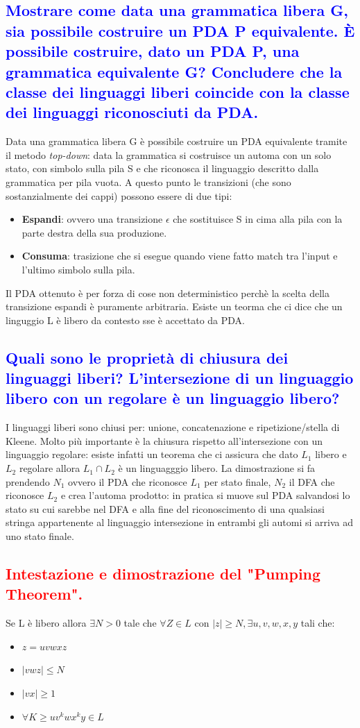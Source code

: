 \documentclass{article}
\begin{document}
\subsection{\textcolor{blue}{Mostrare come data una grammatica libera G, sia possibile costruire un PDA P equivalente.
        È possibile costruire, dato un PDA P, una grammatica equivalente G?
        Concludere che la classe dei linguaggi liberi coincide con la classe dei linguaggi riconosciuti da PDA.}}
Data una grammatica libera G è possibile costruire un PDA equivalente tramite il metodo \textit{top-down}: data la grammatica si costruisce un automa con un solo stato, con simbolo sulla pila S e che riconosca
il linguaggio descritto dalla grammatica per pila vuota. A questo punto le transizioni (che sono sostanzialmente dei cappi) possono essere di due tipi:
\begin{itemize}
    \item \textbf{Espandi}: ovvero una transizione $\epsilon$ che sostituisce S in cima alla pila con la parte destra della sua produzione.
    \item \textbf{Consuma}: trasizione che si esegue quando viene fatto match tra l'input e l'ultimo simbolo sulla pila.
\end{itemize}
Il PDA ottenuto è per forza di cose non deterministico perchè la scelta della transizione espandi è puramente arbitraria.
Esiste un teorma che ci dice che un linguggio L è libero da contesto sse è accettato da PDA.

\subsection{\textcolor{blue}{Quali sono le proprietà di chiusura dei linguaggi liberi? L'intersezione di un linguaggio libero con un regolare è un linguaggio libero?}}
I linguaggi liberi sono chiusi per: unione, concatenazione e ripetizione/stella di Kleene. Molto più importante è la chiusura rispetto all'intersezione con un linguaggio regolare: esiste infatti un
teorema che ci assicura che dato $L_1$ libero e $L_2$ regolare allora $L_1 \cap L_2$ è un linguagggio libero.
La dimostrazione si fa prendendo $N_1$ ovvero il PDA che riconosce $L_1$ per stato finale, $N_2$ il DFA che riconosce $L_2$ e crea l'automa prodotto: in pratica si muove sul PDA salvandosi lo stato su cui
sarebbe nel DFA e alla fine del riconoscimento di una qualsiasi stringa appartenente al linguaggio intersezione in entrambi gli automi si arriva ad uno stato finale.

\subsection{\textcolor{red}{Intestazione e dimostrazione del "Pumping Theorem".}}
Se L è libero allora $\exists N > 0$ tale che $\forall Z \in L$ con $|z| \geq N, \exists u,v,w,x,y$ tali che:
\begin{itemize}
    \item $z = uvwxz$
    \item $|vwz| \leq N$
    \item $|vx| \geq 1$
    \item $\forall K \geq uv^kwx^ky \in L$
\end{itemize}
\end{document}
